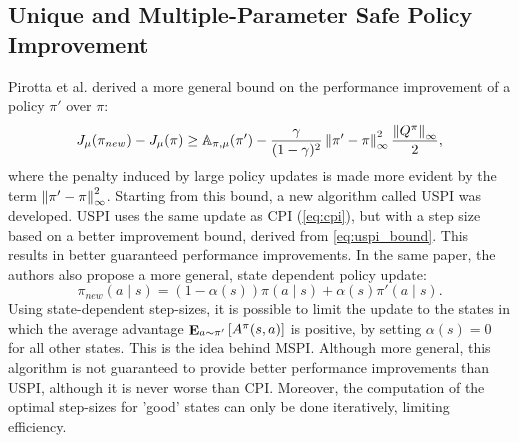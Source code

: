 \subsection{Unique and Multiple-Parameter Safe Policy Improvement}
Pirotta et al. \cite{pirotta2013safe} derived a more general bound on the performance improvement of a policy $\pi'$ over $\pi$:
\begin{equation}\label{eq:uspi_bound}
J_\mu(\pi_{new}) - J_\mu(\pi) \geq \mathbb{A}_{\pi,\mu}(\pi') - \frac{\gamma}{(1-\gamma)^2}
	\norm[\infty]{\pi'-\pi}^2 \frac{\norm[\infty]{Q^\pi}}{2},
\end{equation}
where the penalty induced by large policy updates is made more evident by the term $\norm[\infty]{\pi'-\pi}^2$. Starting from this bound, a new algorithm called \ac{USPI} was developed. \ac{USPI} uses the same update as \ac{CPI} (\ref{eq:cpi}), but with a step size based on a better improvement bound, derived from \ref{eq:uspi_bound}. This results in better guaranteed performance improvements.
In the same paper, the authors also propose a more general, state dependent policy update:
\[
	\pi_{new}(a \mid s) = (1-\alpha(s))\pi(a \mid s) + \alpha(s)\pi'(a \mid s). 
\]
Using state-dependent step-sizes, it is possible to limit the update to the states in which the average advantage $\expected{a}{\pi'}{A^\pi(s,a)}$ is positive, by setting $\alpha(s) = 0$ for all other states. This is the idea behind \ac{MSPI}. Although more general, this algorithm is not guaranteed to provide better performance improvements than \ac{USPI}, although it is never worse than \ac{CPI}. Moreover, the computation of the optimal step-sizes for 'good' states can only be done iteratively, limiting efficiency.

